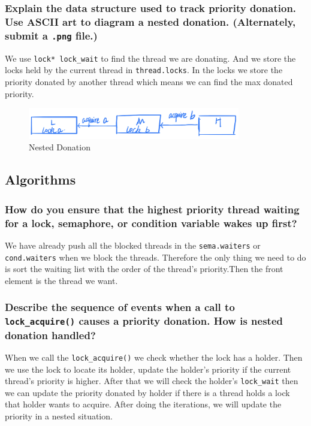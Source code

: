 \documentclass[sigconf, nonacm, balance=false, urlbreakonhyphens=true]{acmart}
\begin{document}
            \subsubsection{Explain the data structure used to track priority donation. Use ASCII art to diagram a nested donation.  (Alternately, submit a \texttt{.png} file.)}

                We use \texttt{lock* lock\_wait} to find the thread we are donating. And we store the locks held by the current thread in \texttt{thread.locks}. In the locks we store the priority donated by another thread which means we can find the max donated priority.
                \noindent \begin{figure}[H]
                    \centering
                    \includegraphics[width=25em]{pic.jpg}
                    \caption{Nested Donation}
                    \label{fig:my_label}
                \end{figure}

        \subsection{Algorithms}

            \subsubsection{How do you ensure that the highest priority thread waiting for a lock, semaphore, or condition variable wakes up first? } 
            
                We have already push all the blocked threads in the \texttt{sema.waiters} or \texttt{cond.waiters} when we block the threads. Therefore the only thing we need to do is sort the waiting list with the order of the thread's priority.Then the front element is the thread we want.

            \subsubsection{Describe the sequence of events when a call to \texttt{lock\_acquire()} causes a priority donation. How is nested donation handled? }

                When we call the \texttt{lock\_acquire()} we check whether the lock has a holder. Then we use the lock to locate its holder, update the holder's priority if the current thread's priority is higher. After that we will check the holder's \texttt{lock\_wait} then we can update the priority donated by holder if there is a thread holds a lock that holder wants to acquire. After doing the iterations, we will update the priority in a nested situation.
\end{document}
